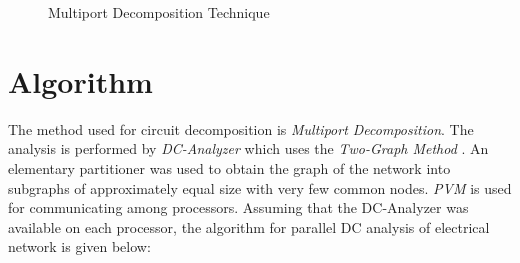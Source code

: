 \documentclass[12pt,psfig,a4]{article}
\begin{document}
\begin{figure}[ht]
{\centering {} \par}
\caption{Multiport Decomposition Technique}
\label{multigen}
\end{figure}


\section{Algorithm}

The method used for circuit decomposition is {\it Multiport Decomposition}. The analysis is
performed by {\it DC-Analyzer} \cite{SHBP} which uses the {\it Two-Graph Method} \cite{SHBP}. An elementary 
partitioner was used to obtain the graph of the network into subgraphs of approximately equal size with very
few common nodes. 
{\it PVM} \cite{PVM,PVMS} is used for communicating among processors. Assuming that the DC-Analyzer was available on
each processor, the algorithm for parallel DC analysis of electrical network is given below:
\end{document}
